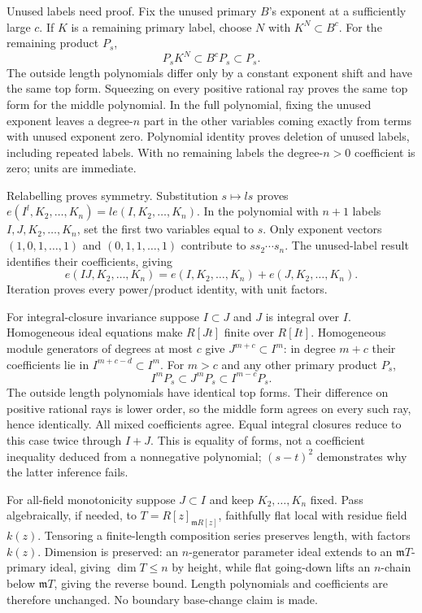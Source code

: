 \documentclass[11pt]{article}
\begin{document}
Unused labels need proof. Fix the unused primary \(B\)'s exponent at a sufficiently large \(c\). If \(K\) is a remaining primary label, choose \(N\) with \(K^N\subset B^c\). For the remaining product \(P_s\),
\[
P_sK^N\subset B^cP_s\subset P_s.
\]
The outside length polynomials differ only by a constant exponent shift and have the same top form. Squeezing on every positive rational ray proves the same top form for the middle polynomial. In the full polynomial, fixing the unused exponent leaves a degree-\(n\) part in the other variables coming exactly from terms with unused exponent zero. Polynomial identity proves deletion of unused labels, including repeated labels. With no remaining labels the degree-\(n>0\) coefficient is zero; units are immediate.

Relabelling proves symmetry. Substitution \(s\mapsto ls\) proves \(e(I^l,K_2,\ldots,K_n)=l e(I,K_2,\ldots,K_n)\). In the polynomial with \(n+1\) labels \(I,J,K_2,\ldots,K_n\), set the first two variables equal to \(s\). Only exponent vectors \((1,0,1,\ldots,1)\) and \((0,1,1,\ldots,1)\) contribute to \(s s_2\cdots s_n\). The unused-label result identifies their coefficients, giving
\[
e(IJ,K_2,\ldots,K_n)=e(I,K_2,\ldots,K_n)+e(J,K_2,\ldots,K_n).
\]
Iteration proves every power/product identity, with unit factors.

For integral-closure invariance suppose \(I\subset J\) and \(J\) is integral over \(I\). Homogeneous ideal equations make \(R[Jt]\) finite over \(R[It]\). Homogeneous module generators of degrees at most \(c\) give \(J^{m+c}\subset I^m\): in degree \(m+c\) their coefficients lie in \(I^{m+c-d}\subset I^m\). For \(m>c\) and any other primary product \(P_s\),
\[
I^mP_s\subset J^mP_s\subset I^{m-c}P_s.
\]
The outside length polynomials have identical top forms. Their difference on positive rational rays is lower order, so the middle form agrees on every such ray, hence identically. All mixed coefficients agree. Equal integral closures reduce to this case twice through \(I+J\). This is equality of forms, not a coefficient inequality deduced from a nonnegative polynomial; \((s-t)^2\) demonstrates why the latter inference fails.

For all-field monotonicity suppose \(J\subset I\) and keep \(K_2,\ldots,K_n\) fixed. Pass algebraically, if needed, to \(T=R[z]_{\mathfrak mR[z]}\), faithfully flat local with residue field \(k(z)\). Tensoring a finite-length composition series preserves length, with factors \(k(z)\). Dimension is preserved: an \(n\)-generator parameter ideal extends to an \(\mathfrak mT\)-primary ideal, giving \(\dim T\le n\) by height, while flat going-down lifts an \(n\)-chain below \(\mathfrak mT\), giving the reverse bound. Length polynomials and coefficients are therefore unchanged. No boundary base-change claim is made.
\end{document}
